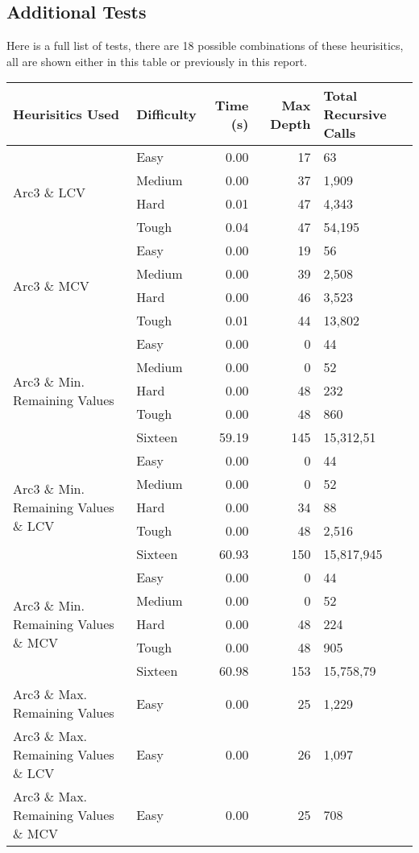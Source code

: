 \documentclass{article}
\begin{document}
\subsection{Additional Tests}
Here is a full list of tests, there are 18 possible combinations of these
heurisitics, all are shown either in this table or previously in this report. \smallskip


{
\centering
\begin{tabular}{m{15em} | l | r | r | l}
Heurisitics Used & Difficulty & Time (s) & Max Depth & Total Recursive Calls \\ \hline \hline
\multirow{4}{*}{Arc3 \&{} LCV}         & Easy   & 0.00 & 17 & 63 \\
                                       & Medium & 0.00 & 37 & 1,909 \\
                                       & Hard   & 0.01 & 47 & 4,343 \\
                                       & Tough  & 0.04 & 47 & 54,195 \\ \hline
\multirow{4}{*}{Arc3 \&{} MCV}         & Easy   & 0.00 & 19 & 56 \\
                                       & Medium & 0.00 & 39 & 2,508 \\
                                       & Hard   & 0.00 & 46 & 3,523 \\
                                       & Tough  & 0.01 & 44 & 13,802 \\ \hline
\multirow{5}{8em}{Arc3 \&{} Min. Remaining Values}
    & Easy   & 0.00 & 0 & 44 \\
    & Medium & 0.00 & 0 & 52 \\
    & Hard   & 0.00 & 48 & 232 \\
    & Tough  & 0.00 & 48 & 860 \\ 
    & Sixteen & 59.19 & 145 & 15,312,51 \\ \hline

\multirow{5}{8em}{Arc3 \&{} Min. Remaining Values \&{} LCV}
    & Easy   & 0.00 & 0 & 44 \\
    & Medium & 0.00 & 0 & 52 \\
    & Hard   & 0.00 & 34 & 88 \\
    & Tough  & 0.00 & 48 & 2,516 \\ 
    & Sixteen & 60.93 & 150 & 15,817,945  \\ \hline

\multirow{5}{8em}{Arc3 \&{} Min. Remaining Values \&{} MCV}
    & Easy   & 0.00 & 0 & 44 \\
    & Medium & 0.00 & 0 & 52 \\
    & Hard   & 0.00 & 48 & 224 \\
    & Tough  & 0.00 & 48 & 905 \\ 
    & Sixteen & 60.98 & 153 & 15,758,79 \\ \hline
Arc3 \&{} Max. Remaining Values 
    & Easy & 0.00 & 25 & 1,229 \\ \hline
Arc3 \&{} Max. Remaining Values \&{} LCV
    & Easy & 0.00 & 26 & 1,097 \\ \hline
Arc3 \&{} Max. Remaining Values \&{} MCV
    & Easy & 0.00 & 25 & 708 \\ \hline



\end{tabular}}
\end{document}
